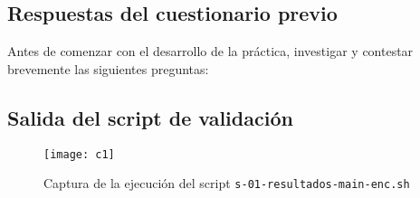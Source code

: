 \documentclass[../main.tex]{subfiles}
\begin{document}
\renewcommand{\thesubsection}{C\arabic{subsection}}

\subsection{Respuestas del cuestionario previo}\label{sec:cuestionario-previo}
Antes de comenzar con el desarrollo de la práctica, investigar y contestar brevemente
las siguientes preguntas:


\subsection{Salida del script de validación}\label{sec:salida-del-script}
\begin{figure}[H]
  \centering
  \texttt{[image: c1]}
  \caption[Salida s-01-resultados-main-enc.sh]{Captura de la ejecución del script \texttt{s-01-resultados-main-enc.sh}}\label{fig:1}
\end{figure}
\end{document}
